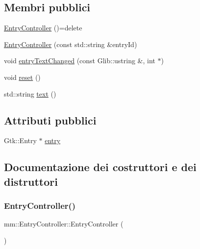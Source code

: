\subsection*{Membri pubblici}
\begin{DoxyCompactItemize}
\item 
\hyperlink{structmm_1_1_entry_controller_a8669618dd4526580cdb3cd88f9d16e52}{Entry\+Controller} ()=delete
\item 
\hyperlink{structmm_1_1_entry_controller_a8c99741ce10e997c35b397cef397fa6d}{Entry\+Controller} (const std\+::string \&entry\+Id)
\item 
void \hyperlink{structmm_1_1_entry_controller_ad4d3a1e3dc08262fe244e8c9bc0a455c}{entry\+Text\+Changed} (const Glib\+::ustring \&, int $\ast$)
\item 
void \hyperlink{structmm_1_1_entry_controller_a8eb56a968a567d1641c47d0f08b23f6f}{reset} ()
\item 
std\+::string \hyperlink{structmm_1_1_entry_controller_a8665e8b7d74b0f8c807d5b3ad418e535}{text} ()
\end{DoxyCompactItemize}
\subsection*{Attributi pubblici}
\begin{DoxyCompactItemize}
\item 
Gtk\+::\+Entry $\ast$ \hyperlink{structmm_1_1_entry_controller_ab41f377d1a98b2bf967c81dc1dc7f391}{entry}
\end{DoxyCompactItemize}


\subsection{Documentazione dei costruttori e dei distruttori}
\mbox{\label{structmm_1_1_entry_controller_a8669618dd4526580cdb3cd88f9d16e52}} 
\subsubsection{\texorpdfstring{Entry\+Controller()}{EntryController()}\hspace{0.1cm}{\footnotesize\ttfamily [1/2]}}
{\footnotesize\ttfamily mm\+::\+Entry\+Controller\+::\+Entry\+Controller (\begin{DoxyParamCaption}{ }\end{DoxyParamCaption})\hspace{0.3cm}{\ttfamily [delete]}}

